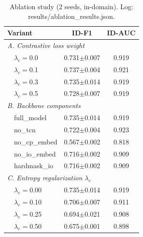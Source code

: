 \begin{table}[!t]
\centering
\caption{Ablation study (2 seeds, in-domain). Log: results/ablation\_results.json.}
\label{tab:abl}
\begin{tabular}{lcc}
\toprule
\textbf{Variant} & \textbf{ID-F1} & \textbf{ID-AUC} \\
\midrule
\multicolumn{3}{l}{\emph{A. Contrastive loss weight}} \\
\ \ $\lambda_c=$0.0            & 0.731$\pm$0.007 & 0.919 \\
\ \ $\lambda_c=$0.1            & 0.737$\pm$0.004 & 0.921 \\
\ \ $\lambda_c=$0.3            & 0.735$\pm$0.014 & 0.919 \\
\ \ $\lambda_c=$0.5            & 0.728$\pm$0.007 & 0.919 \\
\midrule
\multicolumn{3}{l}{\emph{B. Backbone components}} \\
\ \ full\_model                & 0.735$\pm$0.014 & 0.919 \\
\ \ no\_tcn                    & 0.722$\pm$0.004 & 0.923 \\
\ \ no\_cp\_embed              & 0.567$\pm$0.002 & 0.818 \\
\ \ no\_io\_embed              & 0.716$\pm$0.002 & 0.909 \\
\ \ hardmask\_io               & 0.716$\pm$0.002 & 0.909 \\
\midrule
\multicolumn{3}{l}{\emph{C. Entropy regularization $\lambda_e$}} \\
\ \ $\lambda_e=$0.00           & 0.735$\pm$0.014 & 0.919 \\
\ \ $\lambda_e=$0.10           & 0.706$\pm$0.007 & 0.911 \\
\ \ $\lambda_e=$0.25           & 0.694$\pm$0.021 & 0.908 \\
\ \ $\lambda_e=$0.50           & 0.675$\pm$0.001 & 0.898 \\
\bottomrule
\end{tabular}
\end{table}
